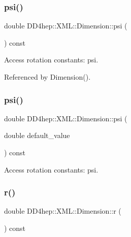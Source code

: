 \subsubsection{\texorpdfstring{psi()}{psi()}\hspace{0.1cm}{\footnotesize\ttfamily [1/2]}}
{\footnotesize\ttfamily double D\+D4hep\+::\+X\+M\+L\+::\+Dimension\+::psi (\begin{DoxyParamCaption}{ }\end{DoxyParamCaption}) const}



Access rotation constants\+: psi. 



Referenced by Dimension().

\hypertarget{struct_d_d4hep_1_1_x_m_l_1_1_dimension_aeb3cd784b05d3e447bbeba176cf967a7}{}\label{struct_d_d4hep_1_1_x_m_l_1_1_dimension_aeb3cd784b05d3e447bbeba176cf967a7} 
\subsubsection{\texorpdfstring{psi()}{psi()}\hspace{0.1cm}{\footnotesize\ttfamily [2/2]}}
{\footnotesize\ttfamily double D\+D4hep\+::\+X\+M\+L\+::\+Dimension\+::psi (\begin{DoxyParamCaption}\item[{double}]{default\+\_\+value }\end{DoxyParamCaption}) const}



Access rotation constants\+: psi. 

\hypertarget{struct_d_d4hep_1_1_x_m_l_1_1_dimension_acfae1ef6199f2de4af8dddec4a0baf4f}{}\label{struct_d_d4hep_1_1_x_m_l_1_1_dimension_acfae1ef6199f2de4af8dddec4a0baf4f} 
\subsubsection{\texorpdfstring{r()}{r()}\hspace{0.1cm}{\footnotesize\ttfamily [1/2]}}
{\footnotesize\ttfamily double D\+D4hep\+::\+X\+M\+L\+::\+Dimension\+::r (\begin{DoxyParamCaption}{ }\end{DoxyParamCaption}) const}



